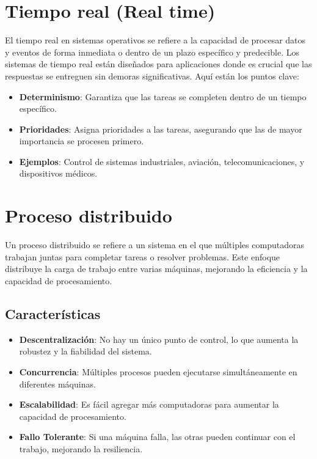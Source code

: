 \section{Tiempo real (Real time)}
El tiempo real en sistemas operativos se refiere a la capacidad de procesar datos y eventos de forma inmediata o dentro de un plazo específico y predecible. Los sistemas de tiempo real están diseñados para aplicaciones donde es crucial que las respuestas se entreguen sin demoras significativas. Aquí están los puntos clave:

\begin{itemize}
	\item \textbf{Determinismo}: Garantiza que las tareas se completen dentro de un tiempo específico.
	\item \textbf{Prioridades}: Asigna prioridades a las tareas, asegurando que las de mayor importancia se procesen primero.
	\item \textbf{Ejemplos}: Control de sistemas industriales, aviación, telecomunicaciones, y dispositivos médicos.
\end{itemize}
\section{Proceso distribuido}
Un proceso distribuido se refiere a un sistema en el que múltiples computadoras trabajan juntas para completar tareas o resolver problemas. Este enfoque distribuye la carga de trabajo entre varias máquinas, mejorando la eficiencia y la capacidad de procesamiento.

\subsection{Características}
\begin{itemize}
	\item \textbf{Descentralización}: No hay un único punto de control, lo que aumenta la robustez y la fiabilidad del sistema.
	\item \textbf{Concurrencia}: Múltiples procesos pueden ejecutarse simultáneamente en diferentes máquinas.
	\item \textbf{Escalabilidad}: Es fácil agregar más computadoras para aumentar la capacidad de procesamiento.
	\item \textbf{Fallo Tolerante}: Si una máquina falla, las otras pueden continuar con el trabajo, mejorando la resiliencia.
\end{itemize}

